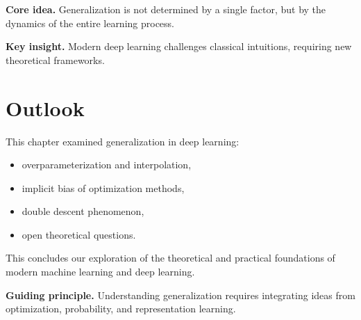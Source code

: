 \noindent
\textbf{Core idea.}  
Generalization is not determined by a single factor, but by the dynamics of the entire learning process.

\medskip

\noindent
\textbf{Key insight.}  
Modern deep learning challenges classical intuitions, requiring new theoretical frameworks.

\section{Outlook}

This chapter examined generalization in deep learning:
\begin{itemize}
    \item overparameterization and interpolation,
    \item implicit bias of optimization methods,
    \item double descent phenomenon,
    \item open theoretical questions.
\end{itemize}

\medskip

This concludes our exploration of the theoretical and practical foundations of modern machine learning and deep learning.

\medskip

\noindent
\textbf{Guiding principle.}  
Understanding generalization requires integrating ideas from optimization, probability, and representation learning.